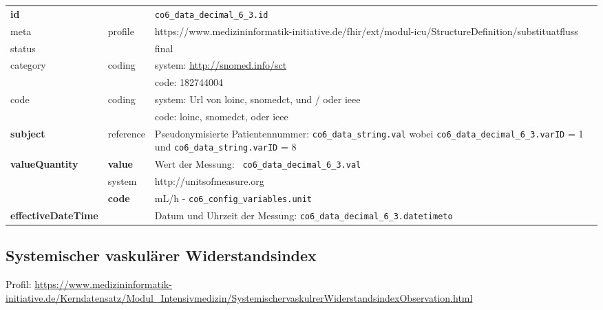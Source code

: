 \begin{longtable}{|l|l|p{7.5cm}|}
        \hline
        \rowcolor{lightgray} \multicolumn{3}{|l|}{Data Mapping (inhaltlich)} \\ \hline
        \textbf{id} &  & \texttt{co6\_data\_decimal\_6\_3.id} \\ \hline
	meta & profile & https://www.medizininformatik-initiative.de/fhir/ext/modul-icu/StructureDefinition/substituatfluss \\ \hline 
	status &  & final   \\ \hline 
	category & coding & system: \url{http://snomed.info/sct} \\
\cline{3-3}
	& & code: 182744004 \\ \hline
	code & coding & system: Url von \ac{loinc}, \ac{snomedct}, und / oder \ac{ieee} \\ 
	\cline{3-3} 
	 &  & code: \ac{loinc}, \ac{snomedct}, oder \ac{ieee} \\ \hline
	 \textbf{subject} & reference & Pseudonymisierte Patientennummer: \texttt{co6\_data\_string.val} wobei \texttt{co6\_data\_decimal\_6\_3.varID} = 1 und \texttt{co6\_data\_string.varID} = 8 \\ \hline
	 \textbf{valueQuantity}  & \textbf{value} & Wert der Messung: \texttt{
co6\_data\_decimal\_6\_3.val} \\
        \cline{2-3}
         & system & http://unitsofmeasure.org \\
         \cline{2-3}
         & \textbf{code} & mL/h - \texttt{co6\_config\_variables.unit} \\ \hline
     \textbf{effectiveDateTime}  & & Datum und Uhrzeit der Messung: \texttt{co6\_data\_decimal\_6\_3.datetimeto} \\ \hline
\end{longtable}

\subsection{Systemischer vaskulärer Widerstandsindex} 
Profil: \url{https://www.medizininformatik-initiative.de/Kerndatensatz/Modul_Intensivmedizin/SystemischervaskulrerWiderstandsindexObservation.html}

